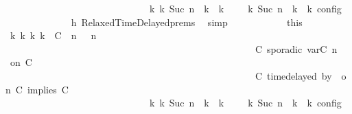 \begin{isabellebody}
\ \ \ \ \ \ \ \ \ \ \ \ \ \ \ \ \ \ \ \ \ \ \ \ \ \ \ \ \ \ {\isasymhookrightarrow}\isactrlbsup k\isactrlesup \ {\isacharparenleft}{\isasymGamma}\isactrlsub k{\isacharcomma}\ Suc\ n\ {\isasymturnstile}\ {\isasymPsi}\isactrlsub k\ {\isasymtriangleright}\ {\isasymPhi}\isactrlsub k{\isacharparenright}{\isacharparenright}\ {\isasymand}\ {\isasymrho}\ {\isasymin}\ {\isasymlbrakk}\ {\isasymGamma}\isactrlsub k{\isacharcomma}\ Suc\ n\ {\isasymturnstile}\ {\isasymPsi}\isactrlsub k\ {\isasymtriangleright}\ {\isasymPhi}\isactrlsub k\ {\isasymrbrakk}\isactrlsub c\isactrlsub o\isactrlsub n\isactrlsub f\isactrlsub i\isactrlsub g{\isacartoucheclose}\isanewline
\ \ \ \ \ \ \ \ \ \ \ \ \isamarkupfalse%
\ h{}\ RelaxedTimeDelayed{\isachardot}prems\ \isamarkupfalse%
\ simp\isanewline
\ \ \ \ \ \ \ \ \ \ \isamarkupfalse%
\ this\ \isamarkupfalse%
\ {\isasymGamma}\isactrlsub k\ {\isasymPsi}\isactrlsub k\ {\isasymPhi}\isactrlsub k\ k\ \ {\isacartoucheopen}{\isacharparenleft}{\isacharparenleft}{\isacharparenleft}{\isacharparenleft}C\ {\isasymUp}\ n{\isacharparenright}\ {\isacharhash}\ {\isasymGamma}{\isacharparenright}{\isacharcomma}\ n\ {\isasymturnstile}\ {\isasymPsi}\isanewline
\ \ \ \ \ \ \ \ \ \ \ \ \ \ \ \ \ \ \ \ \ \ \ \ \ \ \ \ \ \ \ \ \ \ \ \ \ \ \ \ \ \ \ \ \ \ \ \ \ \ \ {\isasymtriangleright}\ {\isacharparenleft}{\isacharparenleft}C\ sporadic{\isasymsharp}\ {\isasymlparr}{\isasymtau}\isactrlsub v\isactrlsub a\isactrlsub r{\isacharparenleft}C\ n{\isacharparenright}\ {\isasymoplus}\ {\isasymdelta}{\isasymtau}{\isasymrparr}\ on\ C\isanewline
\ \ \ \ \ \ \ \ \ \ \ \ \ \ \ \ \ \ \ \ \ \ \ \ \ \ \ \ \ \ \ \ \ \ \ \ \ \ \ \ \ \ \ \ \ \ \ \ \ \ \ {\isacharhash}\ {\isacharparenleft}C\ time{\isacharminus}delayed{\isasymbowtie}\ by\ {\isasymdelta}{\isasymtau}\ on\ C\ implies\ C\ {\isacharhash}\ {\isasymPhi}{\isacharparenright}{\isacharparenright}\isanewline
\ \ \ \ \ \ \ \ \ \ \ \ \ \ \ \ \ \ \ \ \ \ \ \ \ \ \ \ \ \ {\isasymhookrightarrow}\isactrlbsup k\isactrlesup \ {\isacharparenleft}{\isasymGamma}\isactrlsub k{\isacharcomma}\ Suc\ n\ {\isasymturnstile}\ {\isasymPsi}\isactrlsub k\ {\isasymtriangleright}\ {\isasymPhi}\isactrlsub k{\isacharparenright}{\isacharparenright}{\isacartoucheclose}\ \ {\isacharasterisk}{\isacharcolon}{\isacartoucheopen}{\isasymrho}\ {\isasymin}\ {\isasymlbrakk}\ {\isasymGamma}\isactrlsub k{\isacharcomma}\ Suc\ n\ {\isasymturnstile}\ {\isasymPsi}\isactrlsub k\ {\isasymtriangleright}\ {\isasymPhi}\isactrlsub k\ {\isasymrbrakk}\isactrlsub c\isactrlsub o\isactrlsub n\isactrlsub f\isactrlsub i\isactrlsub g{\isacartoucheclose}\isanewline

\end{isabellebody}
